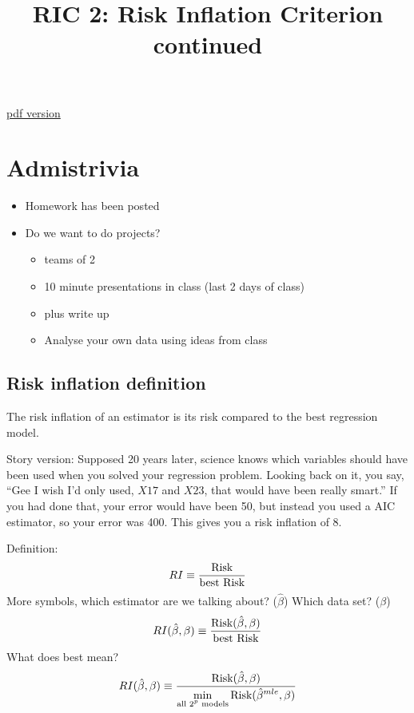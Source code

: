 \documentclass[12pt]{extarticle} %
\begin{document}
\title{RIC 2: Risk Inflation Criterion continued}
\maketitle
\href{class_RIC_2.pdf}{pdf version}
\section{Admistrivia}
\begin{itemize}
\item Homework has been posted
\item Do we want to do projects? 
  \begin{itemize}
  \item teams of 2
  \item 10 minute presentations in class (last 2 days of class)
  \item plus write up
  \item Analyse your own data using ideas from class
  \end{itemize}
\end{itemize}
\subsection{Risk inflation definition}

The risk inflation of an estimator is its risk compared to the best
regression model.

Story version: Supposed 20 years later, science knows which variables
should have been used when you solved your regression problem.
Looking back on it, you say, ``Gee I wish I'd only used, $X17$ and
$X23$, that would have been really smart.''  If you had done that,
your error would have been 50, but instead you used a AIC estimator,
so your error was 400.  This gives you a risk inflation of 8.

Definition:
\begin{displaymath}
RI \equiv \frac{\hbox{Risk}}{\hbox{best Risk}}
\end{displaymath}
More symbols, which estimator are we talking about?  ($\hat{\beta}$) Which data set?  ($\beta$)
\begin{displaymath}
RI(\hat{\beta},\beta) \equiv \frac{\hbox{Risk}(\hat{\beta},\beta)}{\hbox{best Risk}}
\end{displaymath}
What does best mean?
\begin{displaymath}
RI(\hat{\beta},\beta) \equiv
\frac{\hbox{Risk}(\hat{\beta},\beta)}{\displaystyle\min_{\hbox{\scriptsize all $2^p$ models}} \hbox{Risk}(\hat{\beta}^{mle},\beta)}
\end{displaymath}
\end{document}
